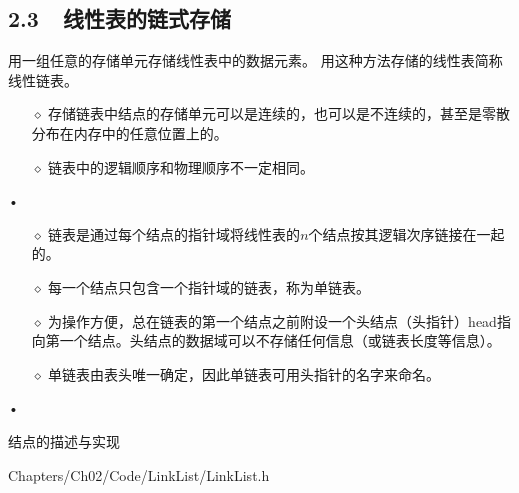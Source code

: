 \subsection{2.3~~线性表的链式存储}
\begin{frame}\ft{\subsecname}
\begin{dingyi}[链式存储]
用一组任意的存储单元存储线性表中的数据元素。
用这种方法存储的线性表简称线性链表。
\end{dingyi}

\pause 
\begin{itemize}
\item[$\diamond$]
存储链表中结点的存储单元可以是连续的，也可以是不连续的，甚至是零散分布在内存中的任意位置上的。
\item[$\diamond$]
链表中的逻辑顺序和物理顺序不一定相同。
\end{itemize}•
\end{frame}


\begin{frame}\ft{\subsecname}


\begin{itemize}
\item[$\diamond$]
链表是通过每个结点的指针域将线性表的$n$个结点按其逻辑次序链接在一起的。
\item[$\diamond$]
每一个结点只包含一个指针域的链表，称为单链表。
\item[$\diamond$]
为操作方便，总在链表的第一个结点之前附设一个头结点（头指针）head指向第一个结点。头结点的数据域可以不存储任何信息（或链表长度等信息）。
\item[$\diamond$]
单链表由表头唯一确定，因此单链表可用头指针的名字来命名。
\end{itemize}•
\end{frame}

\begin{frame}\ft{\subsecname}
 
\end{frame}


\begin{frame}[fragile]\ft{\subsecname}
\begin{block}{结点的描述与实现}
  
                  {Chapters/Ch02/Code/LinkList/LinkList.h}
\end{block}
\end{frame}

